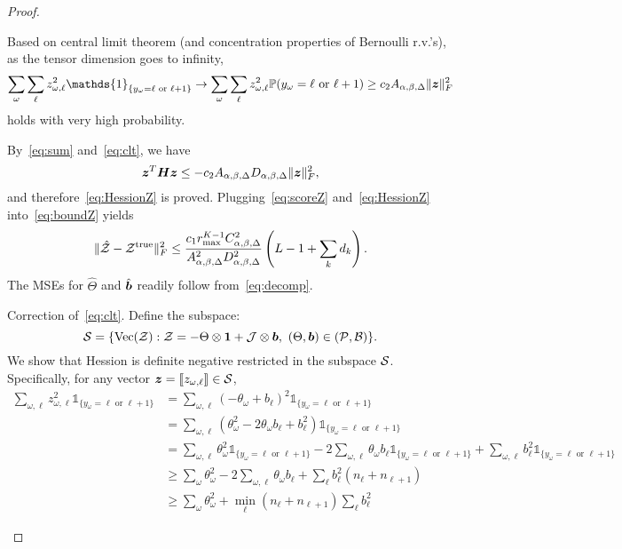 \documentclass[11pt]{article}
\theoremstyle{plain}
\theoremstyle{definition}
\begin{document}
\begin{proof}
\begin{enumerate}
{\color{red}
Based on central limit theorem (and concentration properties of Bernoulli r.v.'s), as the tensor dimension goes to infinity, 
\begin{equation}\label{eq:clt}
\sum_{\omega}\sum_{\ell} z^2_{\omega,\ell}\mathds{1}_{\{y_\omega=\ell \text{ or }\ell+1\}} \rightarrow\sum_{\omega}\sum_{\ell} z^2_{\omega,\ell}\mathbb{P}(y_\omega=\ell \text{ or }\ell+1)\geq c_2A_{\alpha,\beta,\Delta}\FnormSize{}{\mz}^2
\end{equation}
holds with very high probability. 
}

By~\eqref{eq:sum} and~\eqref{eq:clt}, we have
\begin{equation}\label{eq:boundH}
\bm{z}^T\bm{H}\bm{z} \leq-c_2A_{\alpha,\beta,\Delta}D_{\alpha,\beta,\Delta}\lVert\bm{z}\rVert_F^2,
\end{equation}
and therefore~\eqref{eq:HessionZ} is proved. Plugging~\eqref{eq:scoreZ} and~\eqref{eq:HessionZ} into~\eqref{eq:boundZ} yields
\[
\lVert\hat {\mathcal{Z}}-\mathcal{Z}^{\mathrm{true}}\rVert_F^2 \leq {c_1r^{K-1}_{\max}C^2_{\alpha,\beta,\Delta}\over A^2_{\alpha,\beta,\Delta}D^2_{\alpha,\beta,\Delta}}\left(L-1+\sum_k d_k\right).
\]
The MSEs for $\hat \Theta$ and $\hat {\bm{b}}$ readily follow from~\eqref{eq:decomp}. 

{ \color{red}Correction of~\eqref{eq:clt}. Define the subspace:
\[
\mathcal{S}=\{\operatorname{Vec}(\mathcal{Z}): \mathcal{Z}=-\Theta\otimes \mathbf{1}+\mathcal{J}\otimes \bm{b},\ (\Theta,\bm{b})\in(\mathcal{P},\mathcal{B})\}.
\]
We show that Hession is definite negative restricted in the subspace $\mathcal{S}$. Specifically, for any vector $\bm{z}=\llbracket z_{\omega,\ell} \rrbracket\in\mathcal{S}$,
\begin{align}
\sum_{\omega,\ell} z^2_{\omega,\ell}\mathds{1}_{\{y_\omega=\ell \text{ or }\ell+1\}}&=\sum_{\omega,\ell}(-\theta_\omega+b_\ell)^2\mathds{1}_{\{y_\omega=\ell \text{ or }\ell+1\}}\\
&=\sum_{\omega,\ell}(\theta^2_\omega-2\theta_\omega b_\ell + b^2_\ell)\mathds{1}_{\{y_\omega=\ell \text{ or }\ell+1\}}\\
&=\sum_{\omega,\ell}\theta^2_\omega\mathds{1}_{\{y_\omega=\ell \text{ or }\ell+1\}}-2\sum_{\omega,\ell} \theta_\omega b_\ell \mathds{1}_{\{y_\omega=\ell \text{ or }\ell+1\}}+\sum_{\omega,\ell}b^2_\ell\mathds{1}_{\{y_\omega=\ell \text{ or }\ell+1\}}\\
&\geq \sum_{\omega}\theta^2_\omega -2\sum_{\omega,\ell}\theta_\omega b_\ell+\sum_{\ell}b_\ell^2\left(n_{\ell}+n_{\ell+1}\right)\\
&\geq \sum_{\omega}\theta^2_\omega+\min_\ell\left(n_{\ell}+n_{\ell+1}\right)\sum_{\ell}b_\ell^2
\end{align}

}
\end{enumerate}
\end{proof}
\end{document}
